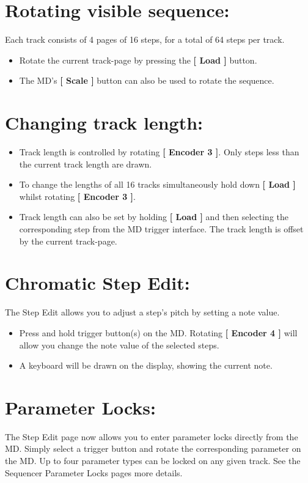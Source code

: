 \vspace{-0.3cm}

\section{Rotating visible sequence:}
Each track consists of 4 pages of 16 steps, for a total of 64 steps per track.
\begin{itemize}
\item Rotate the current track-page by pressing the \textbf{[ Load ] }button.
\item The MD's \textbf{[ Scale ]} button can also be used to rotate the sequence.
\end{itemize}

\vspace{-0.3cm}

\section{Changing track length:}
\begin{itemize}
\item Track length is controlled by rotating \textbf{[ Encoder 3 ]}. Only steps less than the current track length are drawn.
\item To change the lengths of all 16 tracks simultaneously hold down \textbf{[ Load ]} whilst rotating \textbf{[ Encoder 3 ]}.
\item Track length can also be set by holding \textbf{[ Load ]} and then selecting the corresponding step from the MD trigger interface. The track length is offset by the current track-page.
\end{itemize}

\section{Chromatic Step Edit:}
The Step Edit allows you to adjust a step's pitch by setting a note value. 
\begin{itemize}
\item Press and hold trigger button(s) on the MD. Rotating \textbf{[ Encoder 4 ]} will allow you change the note value of the selected steps.
\item A keyboard will be drawn on the display, showing the current note.
\end{itemize}

\section{Parameter Locks:}
The Step Edit page now allows you to enter parameter locks directly from the MD. Simply select a trigger button and rotate the corresponding parameter on the MD. Up to four parameter types can be locked on any given track. See the Sequencer Parameter Locks pages more details.
\newpage
